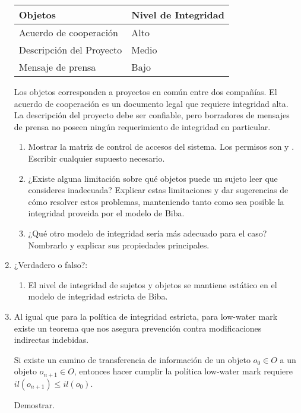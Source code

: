 \begin{enumerate}
\begin{table}[h!]
  \centering
\begin{tabular}{l|l} 
Objetos & Nivel de Integridad \\ 
 \hline
Acuerdo de cooperación   & Alto\\ 
Descripción del Proyecto & Medio\\ 
Mensaje de prensa        & Bajo\\
\end{tabular}
\end{table}

Los objetos corresponden a proyectos en común entre dos compañías. El acuerdo de
cooperación es un documento legal que requiere integridad alta. La descripción
del proyecto debe ser confiable, pero borradores de mensajes de prensa no poseen
ningún requerimiento de integridad en particular.

\begin{enumerate}
  \item Mostrar la matriz de control de accesos del sistema. Los permisos son
     y . Escribir cualquier
    supuesto necesario.

\item ¿Existe alguna limitación sobre qué objetos puede un sujeto leer que
consideres inadecuada? Explicar estas limitaciones y dar sugerencias de cómo
resolver estos problemas, manteniendo tanto como sea posible la integridad
proveida por el modelo de Biba.

\item ¿Qué otro modelo de integridad sería más adecuado para el caso? Nombrarlo y
explicar sus propiedades principales.
\end{enumerate}
\item ¿Verdadero o falso?:

\begin{enumerate}
  \item El nivel de integridad de sujetos y objetos se mantiene estático en el
    modelo de integridad estricta de Biba.
\end{enumerate}
\item Al igual que para la política de integridad estricta, para low-water mark
  existe un teorema que nos asegura prevención contra modificaciones indirectas
  indebidas.
  
  \begin{thm}
    Si existe un camino de transferencia de información de un objeto $o_0 \in O$
    a un objeto $o_{n+1} \in O$, entonces hacer cumplir la política low-water
    mark requiere $il(o_{n+1}) \leq il(o_0)$.
  \end{thm}
  Demostrar.

\end{enumerate}

